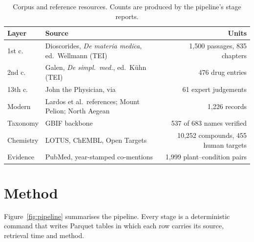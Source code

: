 \documentclass[11pt,a4paper]{article}
\begin{document}
\begin{table}[t]
\centering\small
\caption{Corpus and reference resources. Counts are produced by the pipeline’s stage reports.}
\label{tab:sources}
\begin{tabularx}{\linewidth}{@{}l X r@{}}
\toprule
Layer & Source & Units \\
\midrule
1st c. & Dioscorides, \textit{De materia medica}, ed.\ Wellmann (TEI) & 1,500 passages, 835 chapters \\
2nd c. & Galen, \textit{De simpl.\ med.}, ed.\ Kühn (TEI) & 476 drug entries \\
13th c. & John the Physician, via \citet{lardos2024} & 61 expert judgements \\
Modern & Lardos et al.\ references; Mount Pelion; North Aegean & 1,226 records \\
Taxonomy & GBIF backbone & 537 of 683 names verified \\
Chemistry & LOTUS, ChEMBL, Open Targets & 10,252 compounds, 455 human targets \\
Evidence & PubMed, year-stamped co-mentions & 1,999 plant–condition pairs \\
\bottomrule
\end{tabularx}
\end{table}

\section{Method}

Figure~\ref{fig:pipeline} summarises the pipeline. Every stage is a deterministic command that writes Parquet tables in which each row carries its source, retrieval time and method.
\end{document}
